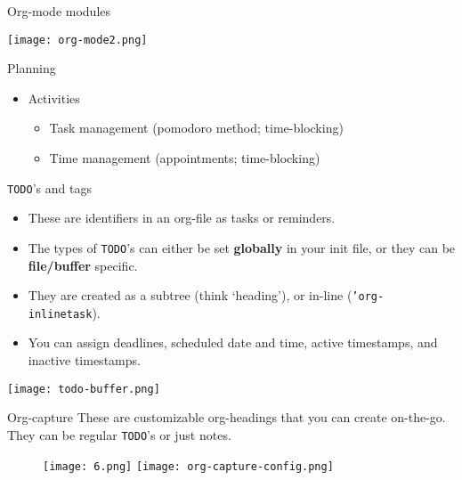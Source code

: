 \documentclass[presentation,xcolor=table]{beamer}
\begin{document}
\begin{frame}[label={sec:org2755a23}]{Org-mode modules}
\begin{center}
\texttt{[image: org-mode2.png]}
\end{center}
\end{frame}



\begin{frame}[label={sec:org8b6026e}]{Planning}
\begin{itemize}
\item Activities
\begin{itemize}
\item Task management (pomodoro method; time-blocking)
\item Time management (appointments; time-blocking)
\end{itemize}
\end{itemize}
\end{frame}

\begin{frame}{\texttt{TODO}'s and tags}
 \small

\begin{itemize}
\item These are identifiers in an org-file as tasks or reminders.
\item The types of \texttt{TODO}'s can either be set \textbf{globally} in your init file, or they can be \textbf{file/buffer} specific.
\item They are created as a subtree (think `heading'), or in-line (\texttt{'org-inlinetask}).
\item You can assign deadlines, scheduled date and time, active timestamps, and inactive timestamps.
\end{itemize}

\begin{center}
\texttt{[image: todo-buffer.png]}
\end{center}

\normalsize
\end{frame}

\begin{frame}[label={sec:org920cdb4},fragile]{Org-capture}
 These are customizable org-headings that you can create on-the-go. They can be regular \texttt{TODO}'s or just notes.


\centering
\begin{figure}
\texttt{[image: 6.png]}
\texttt{[image: org-capture-config.png]}
\end{figure}
\end{frame}
\end{document}
